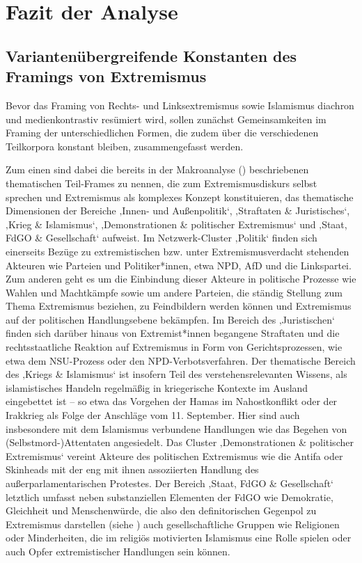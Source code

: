 \section{Fazit der Analyse}\label{fazit-der-analyse}

\subsection{Variantenübergreifende Konstanten des Framings von Extremismus}\label{variantenuebergreifende-konstanten-des-framings-von-extremismus}

Bevor das Framing von Rechts- und Linksextremismus sowie Islamismus diachron und medienkontrastiv resümiert wird, sollen zunächst Gemeinsamkeiten im Framing der unterschiedlichen Formen, die zudem über die verschiedenen Teilkorpora konstant bleiben, zusammengefasst werden.

Zum einen sind dabei die bereits in der Makroanalyse () beschriebenen thematischen Teil-Frames zu nennen, die zum Extremismusdiskurs selbst sprechen und Extremismus als komplexes Konzept konstituieren, das thematische Dimensionen der Bereiche ‚Innen- und Außenpolitik`, ‚Straftaten \& Juristisches`, ‚Krieg \& Islamismus`, ‚Demonstrationen \& politischer Extremismus` und ‚Staat, FdGO \& Gesellschaft` aufweist. Im Netzwerk-Cluster ‚Politik` finden sich einerseits Bezüge zu extremistischen bzw. unter Extremismusverdacht stehenden Akteuren wie Parteien und Politiker*innen, etwa NPD, AfD und die Linkspartei. Zum anderen geht es um die Einbindung dieser Akteure in politische Prozesse wie Wahlen und Machtkämpfe sowie um andere Parteien, die ständig Stellung zum Thema Extremismus beziehen, zu Feindbildern werden können und Extremismus auf der politischen Handlungsebene bekämpfen. Im Bereich des ‚Juristischen` finden sich darüber hinaus von Extremist*innen begangene Straftaten und die rechtsstaatliche Reaktion auf Extremismus in Form von Gerichtsprozessen, wie etwa dem NSU-Prozess oder den NPD-Verbotsverfahren. Der thematische Bereich des ‚Kriegs \& Islamismus` ist insofern Teil des verstehensrelevanten Wissens, als islamistisches Handeln regelmäßig in kriegerische Kontexte im Ausland eingebettet ist -- so etwa das Vorgehen der Hamas im Nahostkonflikt oder der Irakkrieg als Folge der Anschläge vom 11. September. Hier sind auch insbesondere mit dem Islamismus verbundene Handlungen wie das Begehen von (Selbstmord\mbox{-})Attentaten angesiedelt. Das Cluster ‚Demonstrationen \& politischer Extremismus` vereint Akteure des politischen Extremismus wie die Antifa oder Skinheads mit der eng mit ihnen assoziierten Handlung des außerparlamentarischen Protestes. Der Bereich ‚Staat, FdGO \& Gesellschaft` letztlich umfasst neben substanziellen Elementen der FdGO wie Demokratie, Gleichheit und Menschenwürde, die also den definitorischen Gegenpol zu Extremismus darstellen (siehe ) auch gesellschaftliche Gruppen wie Religionen oder Minderheiten, die im religiös motivierten Islamismus eine Rolle spielen oder auch Opfer extremistischer Handlungen sein können.


